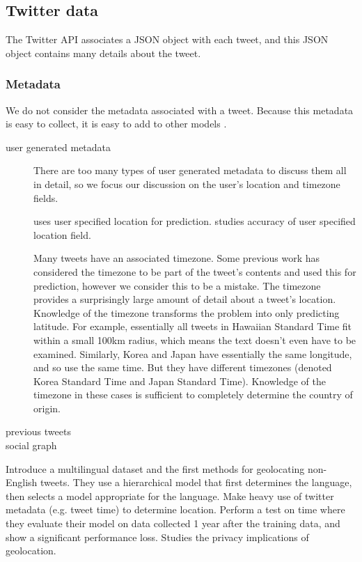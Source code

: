 \documentclass[sigconf,10pt]{acmart}
\begin{document}
\subsection{Twitter data}

The Twitter API associates a JSON object with each tweet,
and this JSON object contains many details about the tweet.

\subsubsection{Metadata}

We do not consider the metadata associated with a tweet. 
Because this metadata is easy to collect,
it is easy to add to other models \citep{han2014text}.

\begin{description}
    \item[user generated metadata] 
        There are too many types of user generated metadata to discuss them all in detail,
        so we focus our discussion on the user's location and timezone fields.

        \citet{schulz2013multi} uses user specified location for prediction.
        \citet{hecht2011tweets} studies accuracy of user specified location field.

        Many tweets have an associated timezone.
        Some previous work \citep{schulz2013multi,han2014text} has considered the timezone to be part of the tweet's contents and used this for prediction,
        however we consider this to be a mistake.
        The timezone provides a surprisingly large amount of detail about a tweet's location.
        Knowledge of the timezone transforms the problem into only predicting latitude.
        For example, essentially all tweets in Hawaiian Standard Time fit within a small 100km radius, which means the text doesn't even have to be examined.
        Similarly, Korea and Japan have essentially the same longitude, and so use the same time.
        But they have different timezones (denoted Korea Standard Time and Japan Standard Time).
        Knowledge of the timezone in these cases is sufficient to completely determine the country of origin.
        
    \item[previous tweets]
    \item[social graph]
\end{description}

Introduce a multilingual dataset and the first methods for geolocating non-English tweets.
They use a hierarchical model that first determines the language,
then selects a model appropriate for the language.
Make heavy use of twitter metadata (e.g. tweet time) to determine location.
Perform a test on time where they evaluate their model on data collected 1 year after the training data, and show a significant performance loss.
Studies the privacy implications of geolocation.
\end{document}

